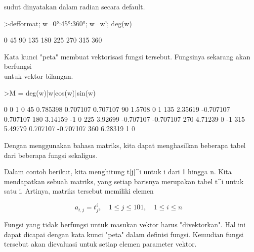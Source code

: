 \documentclass[a4paper,10pt]{article}
\begin{document}
\begin{eulernotebook}
\begin{eulercomment}
\begin{eulercomment}
\begin{eulercomment}
\begin{eulercomment}
\begin{eulercomment}
\begin{eulercomment}
\begin{eulercomment}
\begin{eulercomment}
\begin{eulercomment}
sudut dinyatakan dalam radian secara default.
\end{eulercomment}
\begin{eulerprompt}
>defformat; w=0°:45°:360°; w=w'; deg(w)
\end{eulerprompt}
\begin{euleroutput}
              0 
             45 
             90 
            135 
            180 
            225 
            270 
            315 
            360 
\end{euleroutput}
\begin{eulercomment}
Kata kunci "peta" membuat vektorisasi fungsi tersebut. Fungsinya
sekarang akan berfungsi\\
untuk vektor bilangan.
\end{eulercomment}
\begin{eulerprompt}
>M = deg(w)|w|cos(w)|sin(w)
\end{eulerprompt}
\begin{euleroutput}
              0             0             1             0 
             45      0.785398      0.707107      0.707107 
             90        1.5708             0             1 
            135       2.35619     -0.707107      0.707107 
            180       3.14159            -1             0 
            225       3.92699     -0.707107     -0.707107 
            270       4.71239             0            -1 
            315       5.49779      0.707107     -0.707107 
            360       6.28319             1             0 
\end{euleroutput}
\begin{eulercomment}
Dengan menggunakan bahasa matriks, kita dapat menghasilkan beberapa
tabel dari beberapa fungsi sekaligus.

Dalam contoh berikut, kita menghitung t[j]\textasciicircum{}i untuk i dari 1 hingga n.
Kita mendapatkan sebuah matriks, yang setiap barisnya merupakan tabel
t\textasciicircum{}i untuk satu i. Artinya, matriks tersebut memiliki elemen\\
\end{eulercomment}
\begin{eulerformula}
\[
a_{i,j} = t_j^i, \quad 1 \le j \le 101, \quad 1 \le i \le n
\]
\end{eulerformula}
\begin{eulercomment}
Fungsi yang tidak berfungsi untuk masukan vektor harus "divektorkan".
Hal ini dapat dicapai dengan kata kunci "peta" dalam definisi fungsi.
Kemudian fungsi tersebut akan dievaluasi untuk setiap elemen parameter
vektor.


\end{eulercomment}
\end{eulercomment}
\end{eulercomment}
\end{eulercomment}
\end{eulercomment}
\end{eulercomment}
\end{eulercomment}
\end{eulercomment}
\end{eulercomment}
\end{eulernotebook}
\end{document}
